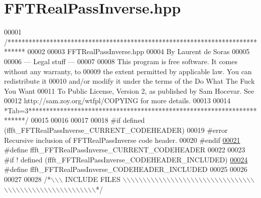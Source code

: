 \hypertarget{a00103_source}{\section{F\+F\+T\+Real\+Pass\+Inverse.\+hpp}
\label{a00103_source}
}

\begin{DoxyCode}
00001 \textcolor{comment}{/*****************************************************************************}
00002 \textcolor{comment}{}
00003 \textcolor{comment}{        FFTRealPassInverse.hpp}
00004 \textcolor{comment}{        By Laurent de Soras}
00005 \textcolor{comment}{}
00006 \textcolor{comment}{--- Legal stuff ---}
00007 \textcolor{comment}{}
00008 \textcolor{comment}{This program is free software. It comes without any warranty, to}
00009 \textcolor{comment}{the extent permitted by applicable law. You can redistribute it}
00010 \textcolor{comment}{and/or modify it under the terms of the Do What The Fuck You Want}
00011 \textcolor{comment}{To Public License, Version 2, as published by Sam Hocevar. See}
00012 \textcolor{comment}{http://sam.zoy.org/wtfpl/COPYING for more details.}
00013 \textcolor{comment}{}
00014 \textcolor{comment}{*Tab=3***********************************************************************/}
00015 
00016 
00017 
00018 \textcolor{preprocessor}{#if defined (ffft\_FFTRealPassInverse\_CURRENT\_CODEHEADER)}
00019 \textcolor{preprocessor}{    #error Recursive inclusion of FFTRealPassInverse code header.}
00020 \textcolor{preprocessor}{#endif}
\hypertarget{a00103_source_l00021}{}\hyperlink{a00103_ae931353e6f478a7f98f0ee9fabf2f1cb}{00021} \textcolor{preprocessor}{#define ffft\_FFTRealPassInverse\_CURRENT\_CODEHEADER}
00022 
00023 \textcolor{preprocessor}{#if ! defined (ffft\_FFTRealPassInverse\_CODEHEADER\_INCLUDED)}
\hypertarget{a00103_source_l00024}{}\hyperlink{a00103_a4059fcd80b5209e6ac195daa967a6393}{00024} \textcolor{preprocessor}{#define ffft\_FFTRealPassInverse\_CODEHEADER\_INCLUDED}
00025 
00026 
00027 
00028 \textcolor{comment}{/*\(\backslash\)\(\backslash\)\(\backslash\) INCLUDE FILES \(\backslash\)\(\backslash\)\(\backslash\)\(\backslash\)\(\backslash\)\(\backslash\)\(\backslash\)\(\backslash\)\(\backslash\)\(\backslash\)\(\backslash\)\(\backslash\)\(\backslash\)\(\backslash\)\(\backslash\)\(\backslash\)\(\backslash\)\(\backslash\)\(\backslash\)\(\backslash\)\(\backslash\)\(\backslash\)\(\backslash\)\(\backslash\)\(\backslash\)\(\backslash\)\(\backslash\)\(\backslash\)\(\backslash\)\(\backslash\)\(\backslash\)\(\backslash\)\(\backslash\)\(\backslash\)\(\backslash\)\(\backslash\)\(\backslash\)\(\backslash\)\(\backslash\)\(\backslash\)\(\backslash\)\(\backslash\)\(\backslash\)\(\backslash\)\(\backslash\)\(\backslash\)\(\backslash\)\(\backslash\)\(\backslash\)\(\backslash\)\(\backslash\)\(\backslash\)\(\backslash\)\(\backslash\)\(\backslash\)\(\backslash\)*/}

\end{DoxyCode}
